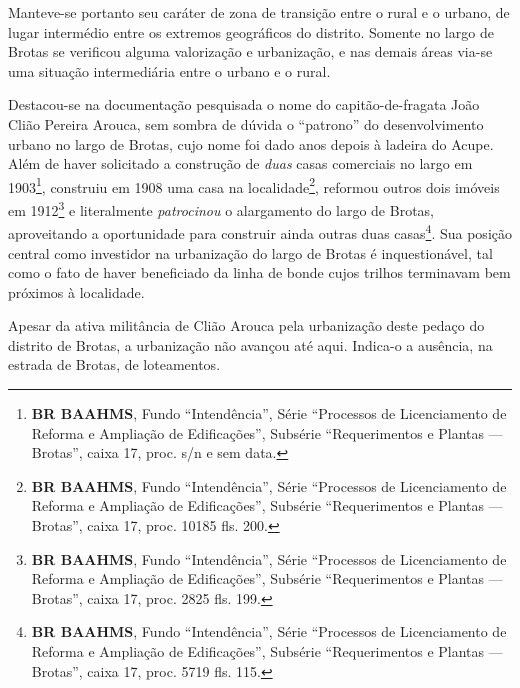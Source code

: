 
Manteve-se portanto seu caráter de zona de transição entre o rural e o urbano, de lugar intermédio entre os extremos geográficos do distrito. Somente no largo de Brotas se verificou alguma valorização e urbanização, e nas demais áreas via-se uma situação intermediária entre o urbano e o rural.





Destacou-se na documentação pesquisada o nome do capitão-de-fragata João Clião Pereira Arouca, sem sombra de dúvida o ``patrono'' do desenvolvimento urbano no largo de Brotas, cujo nome foi dado anos depois à ladeira do Acupe. Além de haver solicitado a construção de \textit{duas} casas comerciais no largo em 1903\footnote{\textbf{BR BAAHMS}, Fundo ``Intendência'', Série ``Processos de Licenciamento de Reforma e Ampliação de Edificações'', Subsérie ``Requerimentos e Plantas --- Brotas'', caixa 17, proc. s/n e sem data.}, construiu em 1908 uma casa na localidade\footnote{\textbf{BR BAAHMS}, Fundo ``Intendência'', Série ``Processos de Licenciamento de Reforma e Ampliação de Edificações'', Subsérie ``Requerimentos e Plantas --- Brotas'', caixa 17, proc. 10185 fls. 200.}, reformou outros dois imóveis em 1912\footnote{\textbf{BR BAAHMS}, Fundo ``Intendência'', Série ``Processos de Licenciamento de Reforma e Ampliação de Edificações'', Subsérie ``Requerimentos e Plantas --- Brotas'', caixa 17, proc. 2825 fls. 199.} e literalmente \textit{patrocinou} o alargamento do largo de Brotas, aproveitando a oportunidade para construir ainda outras duas casas\footnote{\textbf{BR BAAHMS}, Fundo ``Intendência'', Série ``Processos de Licenciamento de Reforma e Ampliação de Edificações'', Subsérie ``Requerimentos e Plantas --- Brotas'', caixa 17, proc. 5719 fls. 115.}. Sua posição central como investidor na urbanização do largo de Brotas é inquestionável, tal como o fato de haver beneficiado da linha de bonde cujos trilhos terminavam bem próximos à localidade.


Apesar da ativa militância de Clião Arouca pela urbanização deste pedaço do distrito de Brotas, a urbanização não avançou até aqui. Indica-o a ausência, na estrada de Brotas, de loteamentos. 


